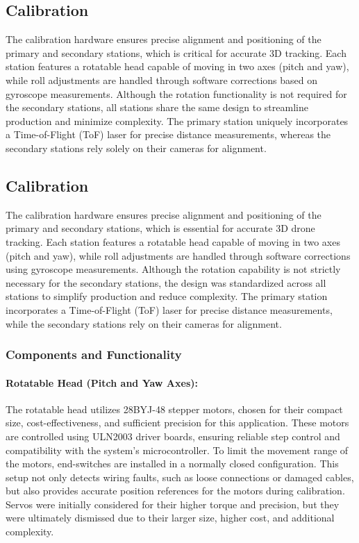 \subsection{Calibration}

The calibration hardware ensures precise alignment and positioning of the primary and secondary stations, which is critical for accurate 3D tracking. Each station features a rotatable head capable of moving in two axes (pitch and yaw), while roll adjustments are handled through software corrections based on gyroscope measurements. Although the rotation functionality is not required for the secondary stations, all stations share the same design to streamline production and minimize complexity. The primary station uniquely incorporates a Time-of-Flight (ToF) laser for precise distance measurements, whereas the secondary stations rely solely on their cameras for alignment.

\subsection{Calibration}

The calibration hardware ensures precise alignment and positioning of the primary and secondary stations, which is essential for accurate 3D drone tracking. Each station features a rotatable head capable of moving in two axes (pitch and yaw), while roll adjustments are handled through software corrections using gyroscope measurements. Although the rotation capability is not strictly necessary for the secondary stations, the design was standardized across all stations to simplify production and reduce complexity. The primary station incorporates a Time-of-Flight (ToF) laser for precise distance measurements, while the secondary stations rely on their cameras for alignment.

\subsubsection*{Components and Functionality}

\paragraph{Rotatable Head (Pitch and Yaw Axes):}
The rotatable head utilizes 28BYJ-48 stepper motors, chosen for their compact size, cost-effectiveness, and sufficient precision for this application. These motors are controlled using ULN2003 driver boards, ensuring reliable step control and compatibility with the system's microcontroller. To limit the movement range of the motors, end-switches are installed in a normally closed configuration. This setup not only detects wiring faults, such as loose connections or damaged cables, but also provides accurate position references for the motors during calibration. Servos were initially considered for their higher torque and precision, but they were ultimately dismissed due to their larger size, higher cost, and additional complexity.


